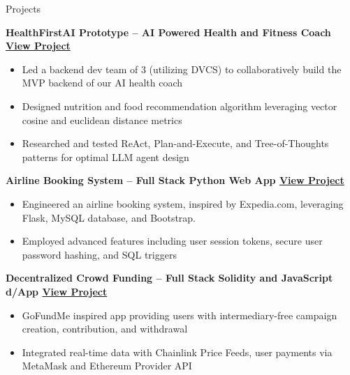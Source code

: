 \documentclass{resume} %
\begin{document}
\begin{rSection}{Projects}

	\textbf{HealthFirstAI Prototype – AI Powered Health and Fitness Coach \href{https://youtu.be/FFocBeiQ8dE}{View Project}}
	\begin{itemize}
		\item Led a backend dev team of 3 (utilizing DVCS) to collaboratively build the MVP backend of our AI health coach
		\item Designed nutrition and food recommendation algorithm leveraging vector cosine and euclidean distance metrics
		\item Researched and tested ReAct, Plan-and-Execute, and Tree-of-Thoughts patterns for optimal LLM agent design
	\end{itemize}

	\textbf{Airline Booking System – Full Stack Python Web App \href{https://github.com/larry-lime/airline-ticket-system}{View Project}}
	\begin{itemize}
		\item Engineered an airline booking system, inspired by Expedia.com, leveraging Flask, MySQL database, and Bootstrap.
		\item Employed advanced features including user session tokens, secure user password hashing, and SQL triggers
	\end{itemize}

	\textbf{Decentralized Crowd Funding – Full Stack Solidity and JavaScript d/App \href{https://github.com/larry-lime/fund-me-backend}{View Project}}
	\begin{itemize}
		\item GoFundMe inspired app providing users with intermediary-free campaign creation, contribution, and withdrawal
		\item Integrated real-time data with Chainlink Price Feeds, user payments via MetaMask and Ethereum Provider API
	\end{itemize}

\end{rSection}

\end{document}
